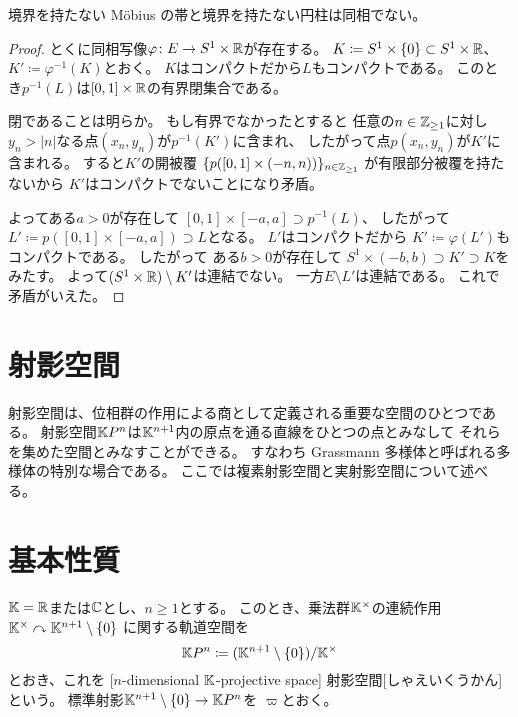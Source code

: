 \documentclass[report]{jlreq}
\begin{document}
\begin{proposition}
    境界を持たない M\"{o}bius の帯と境界を持たない円柱は同相でない。
\end{proposition}

\begin{proof}
    とくに同相写像$\varphi \colon E \to S^1 \times \mathbb{R}$が存在する。
    $K \coloneqq S^1 \times \{ 0 \} \subset S^1 \times \mathbb{R}$、
    $K' \coloneqq \varphi^{-1}(K)$とおく。
    $K$はコンパクトだから$L$もコンパクトである。
    このとき$p^{-1}(L)$は$[0, 1] \times \mathbb{R}$の有界閉集合である。
    \begin{innerproof}
        閉であることは明らか。
        もし有界でなかったとすると
        任意の$n \in \mathbb{Z}_{\ge 1}$に対し
        $y_n > |n|$なる点$(x_n, y_n)$が$p^{-1}(K')$に含まれ、
        したがって点$p(x_n, y_n)$が$K'$に含まれる。
        すると$K'$の開被覆
        $\{ p([0, 1] \times (-n, n)) \}_{n \in \mathbb{Z}_{\ge 1}}$
        が有限部分被覆を持たないから
        $K'$はコンパクトでないことになり矛盾。
    \end{innerproof}
    よってある$a > 0$が存在して
    $[0, 1] \times [-a, a] \supset p^{-1}(L)$、
    したがって$L' \coloneqq p([0, 1] \times [-a, a]) \supset L$となる。
    $L'$はコンパクトだから
    $K' \coloneqq \varphi(L')$もコンパクトである。
    したがって
    ある$b > 0$が存在して
    $S^1 \times (-b, b) \supset K' \supset K$をみたす。
    よって$(S^1 \times \mathbb{R}) \setminus K'$は連結でない。
    一方$E \setminus L'$は連結である。
    これで矛盾がいえた。
\end{proof}

%
\section{射影空間}

射影空間は、位相群の作用による商として定義される重要な空間のひとつである。
射影空間$\mathbb{K} P^n$は$\mathbb{K}^{n + 1}$内の原点を通る直線をひとつの点とみなして
それらを集めた空間とみなすことができる。
すなわち Grassmann 多様体と呼ばれる多様体の特別な場合である。
ここでは複素射影空間と実射影空間について述べる。

\section{基本性質}

\begin{definition}[射影空間]
    $\mathbb{K} = \mathbb{R}$または$\mathbb{C}$とし、$n \ge 1$とする。
    このとき、乗法群$\mathbb{K}^\times$の連続作用
    $\mathbb{K}^\times \curvearrowright \mathbb{K}^{n + 1} \setminus \{ 0 \}$
    に関する軌道空間を
    \begin{equation}
        \mathbb{K} P^n \coloneqq (\mathbb{K}^{n + 1} \setminus \{ 0 \}) / \mathbb{K}^\times
    \end{equation}
    とおき、これを
    [$n$-dimensional $\mathbb{K}$-projective space]
    {射影空間}[しゃえいくうかん]
    という。
   標準射影$\mathbb{K}^{n + 1} \setminus \{ 0 \} \to \mathbb{K} P^n$を
    $\varpi$とおく。
\end{definition}
\end{document}
